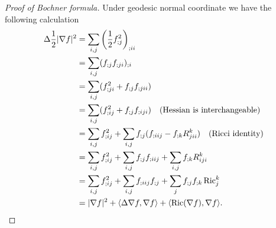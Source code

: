 \begin{proof}[Proof of Bochner formula]
    Under geodesic normal coordinate we have the following calculation
    \begin{align*}
        \Delta\frac{1}{2}|\nabla f|^2&=\sum_{i,j}\left(\frac{1}{2}f^2_{;j}\right)_{;ii}\\
        &=\sum_{i,j}(f_{;j}f_{;ji})_{;i}\\
        &=\sum_{i,j}(f^2_{;ji}+f_{;j}f_{;jii})\\
        &=\sum_{i,j}(f^2_{;ij}+f_{;j}f_{;iji})\quad\text{(Hessian is interchangeable)}\\
        &=\sum_{i,j}f^2_{;ij}+\sum_{i,j}f_{;j}(f_{;iij}-f_{;k}R_{jii}^k)\quad\text{(Ricci identity)}\\
        &=\sum_{i,j}f^2_{;ij}+\sum_{i,j}f_{;j}f_{;iij}+\sum_{i,j}f_{;k}R_{iji}^k\\
        &=\sum_{i,j}f^2_{;ij}+\sum_{i,j}f_{;iij}f_{;j}+\sum_{j}f_{;j}f_{;k}\operatorname{Ric}_j^k\\
        &=|\nabla f|^2+\langle\Delta\nabla f,\nabla f\rangle+\langle\operatorname{Ric}(\nabla f),\nabla f\rangle.\qedhere
    \end{align*}
\end{proof}